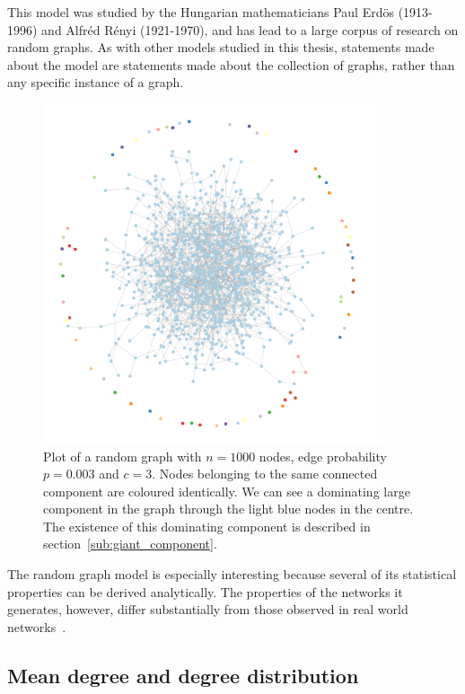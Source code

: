 This model was studied by the Hungarian mathematicians Paul Erd\"os (1913-1996) and Alfr\'ed R\'enyi (1921-1970), and has lead to a large corpus of research on random graphs.
As with other models studied in this thesis, statements made about the model are statements made about the collection of graphs, rather than any specific instance of a graph.

\begin{figure}[tb]
	\centering
	\includegraphics[width=10cm]{figures/gnp_hairball.png}
	\caption{Plot of a random graph with $n = 1000$ nodes, edge probability $p = 0.003$ and $c=3$. 
	Nodes belonging to the same connected component are coloured identically.
	We can see a dominating large component in the graph through the light blue nodes in the centre.
	The existence of this dominating component is described in section~\ref{sub:giant_component}.}
	\label{fig:hairball}
\end{figure}

The random graph model is especially interesting because several of its statistical properties can be derived analytically.
The properties of the networks it generates, however, differ substantially from those observed in real world networks~\cite{Albert:2002p4071}.

\subsection{Mean degree and degree distribution} %
\label{ssub:mean_degree_and_degree_distribution}

